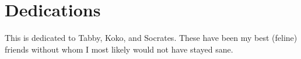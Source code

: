 \chapter{Dedications}
This is dedicated to Tabby, Koko, and Socrates.
These have been my best (feline) friends without whom I most likely would not have stayed sane.